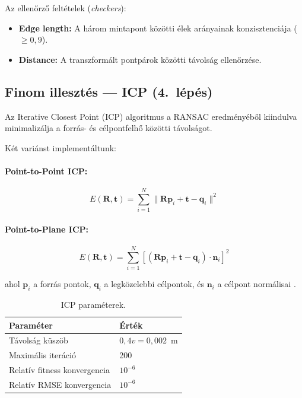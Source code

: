 \documentclass[12pt,a4paper]{article}
\begin{document}
Az ellenőrző feltételek (\textit{checkers}):
\begin{itemize}[nosep]
    \item \textbf{Edge length:} A három mintapont közötti élek arányainak konzisztenciája ($\geq 0{,}9$).
    \item \textbf{Distance:} A transzformált pontpárok közötti távolság ellenőrzése.
\end{itemize}

\subsection{Finom illesztés — ICP (4.~lépés)}

Az Iterative Closest Point (ICP) \cite{besl1992} algoritmus a RANSAC eredményéből kiindulva minimalizálja a forrás- és célpontfelhő közötti távolságot.

Két variánst implementáltunk:

\paragraph{Point-to-Point ICP:}
\begin{equation}
    E(\mathbf{R}, \mathbf{t}) = \sum_{i=1}^{N} \| \mathbf{R} \mathbf{p}_i + \mathbf{t} - \mathbf{q}_i \|^2
\end{equation}

\paragraph{Point-to-Plane ICP:}
\begin{equation}
    E(\mathbf{R}, \mathbf{t}) = \sum_{i=1}^{N} \left[ (\mathbf{R} \mathbf{p}_i + \mathbf{t} - \mathbf{q}_i) \cdot \mathbf{n}_i \right]^2
\end{equation}

ahol $\mathbf{p}_i$ a forrás pontok, $\mathbf{q}_i$ a legközelebbi célpontok, és $\mathbf{n}_i$ a célpont normálisai \cite{chen1992}.

\begin{table}[H]
\centering
\begin{tabular}{ll}
\toprule
\textbf{Paraméter} & \textbf{Érték} \\
\midrule
Távolság küszöb & $0{,}4v = 0{,}002$~m \\
Maximális iteráció & 200 \\
Relatív fitness konvergencia & $10^{-6}$ \\
Relatív RMSE konvergencia & $10^{-6}$ \\
\bottomrule
\end{tabular}
\caption{ICP paraméterek.}
\end{table}
\end{document}
